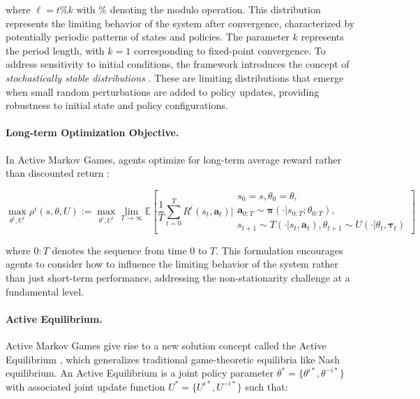 where $\ell = t\%k$ with $\%$ denoting the modulo operation. This distribution represents the limiting behavior of the system after convergence, characterized by potentially periodic patterns of states and policies. The parameter $k$ represents the period length, with $k=1$ corresponding to fixed-point convergence. To address sensitivity to initial conditions, the framework introduces the concept of \textit{stochastically stable distributions} \cite{kim2022influencing}. These are limiting distributions that emerge when small random perturbations are added to policy updates, providing robustness to initial state and policy configurations.

\paragraph{Long-term Optimization Objective.} In Active Markov Games, agents optimize for long-term average reward rather than discounted return \cite{sutton2018reinforcement, kim2022influencing}:

\begin{equation}
    \max_{\theta^i, U^i} \rho^i(s, \theta, U) := \max_{\theta^i, U^i} \lim_{T \to \infty} \mathbb{E}\left[\frac{1}{T}\sum_{t=0}^T R^i(s_t, \mathbf{a}_t) \Bigg|
        \begin{array}{c}
            s_0=s, \theta_0=\theta,                                              \\
            \mathbf{a}_{0:T} \sim \boldsymbol{\pi}(\cdot|s_{0:T}; \theta_{0:T}), \\
            s_{t+1} \sim T(\cdot|s_t, \mathbf{a}_t),
            \theta_{t+1} \sim U(\cdot|\theta_t, \boldsymbol{\tau}_t)
        \end{array}
        \right]
\end{equation}

where  $0:T$ denotes the sequence from time $0$ to $T$. This formulation encourages agents to consider how to influence the limiting behavior of the system rather than just short-term performance, addressing the non-stationarity challenge at a fundamental level.

\paragraph{Active Equilibrium.} Active Markov Games give rise to a new solution concept called the Active Equilibrium \cite{kim2022influencing}, which generalizes traditional game-theoretic equilibria like Nash equilibrium. An Active Equilibrium is a joint policy parameter $\theta^* = \{\theta^{i*}, \theta^{-i*}\}$ with associated joint update function $U^* = \{U^{i*}, U^{-i*}\}$ such that:

